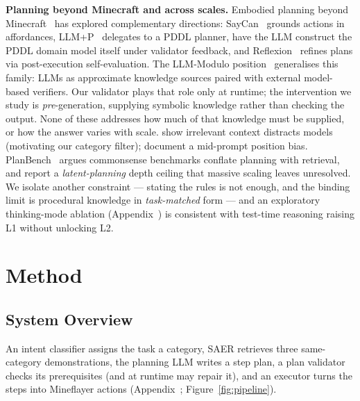 \documentclass[letterpaper]{article} %
\newcommand{\appref}[1]{Appendix~\getrefnumber{#1}}
\begin{document}
\noindent\textbf{Planning beyond Minecraft and across scales.}
Embodied planning beyond Minecraft~\citep{huang2022language} has
explored complementary directions: SayCan~\citep{ahn2022can} grounds
actions in affordances, LLM+P~\citep{liu2023llmp} delegates to a PDDL
planner, \citet{guan2023leveraging} have the LLM construct the PDDL
domain model itself under validator feedback, and
Reflexion~\citep{shinn2023reflexion} refines plans via
post-execution self-evaluation.  The LLM-Modulo
position~\citep{kambhampati2024position} generalises this family: LLMs as
approximate knowledge sources paired with external model-based
verifiers.  Our validator plays that role only at runtime; the intervention we study is
\emph{pre}-generation, supplying symbolic knowledge rather than checking the
output.  None of these addresses
how much of that knowledge must be supplied, or how the answer varies
with scale.  \citet{shi2023large} show irrelevant
context distracts models (motivating our category filter);
\citet{liu2024lost} document a mid-prompt position bias.  PlanBench~\citep{valmeekam2023planbench} argues
commonsense benchmarks conflate planning with retrieval, and
\citet{xu2026depthceiling} report a \emph{latent-planning} depth ceiling
that massive scaling leaves unresolved.  We isolate another constraint --- stating the rules is not enough, and
the binding limit is procedural knowledge in \emph{task-matched} form --- and an
exploratory thinking-mode ablation (\appref{app:thinking}) is consistent with
test-time reasoning raising L1 without unlocking L2.

\section{Method}

\subsection{System Overview}

An intent classifier assigns the task a category, SAER retrieves three
same-category demonstrations, the planning LLM writes a step plan, a plan
validator checks its prerequisites (and at runtime may repair it), and an
executor turns the steps into Mineflayer actions (\appref{sec:exec};
Figure~\ref{fig:pipeline}).
\end{document}
